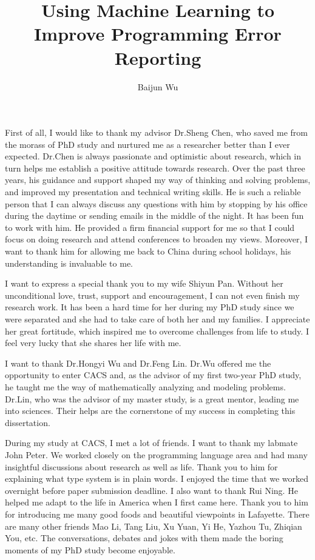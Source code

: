 \documentclass[12pt]{report}	%
\author{Baijun Wu}
\title{Using Machine Learning to Improve Programming Error Reporting}
\begin{document}
\titlepage              %

\copyrightpage          %

\approvalpage           %

%
%
%

\begin{acknowledgments}		%

First of all, I would like to thank my advisor Dr.Sheng Chen, 
who saved me from the morass of PhD study and nurtured me as a researcher better than I ever expected.
%
Dr.Chen is always passionate and optimistic about research,
which in turn helps me establish a positive attitude towards research.
Over the past three years, his guidance and support shaped my way of thinking and solving problems,
and improved my presentation and technical writing skills.
%
He is such a reliable person that I can always discuss any questions with him 
by stopping by his office during the daytime or sending emails in the middle of the night.
It has been fun to work with him.
%
He provided a firm financial support for me 
so that I could focus on doing research and attend conferences to broaden my views.
Moreover, I want to thank him for allowing me back to China during school holidays,
his understanding is invaluable to me.

I want to express a special thank you to my wife Shiyun Pan.
Without her unconditional love, trust, support and encouragement,
I can not even finish my research work.
%
It has been a hard time for her during my PhD study since we were separated
and she had to take care of both her and my families.
I appreciate her great fortitude, which inspired me to overcome challenges from life to study. 
I feel very lucky that she shares her life with me.

I want to thank Dr.Hongyi Wu and Dr.Feng Lin.
Dr.Wu offered me the opportunity to enter CACS and,
as the advisor of my first two-year PhD study, 
he taught me the way of mathematically analyzing and modeling problems.
Dr.Lin, who was the advisor of my master study, is a great mentor, leading me into sciences.
Their helps are the cornerstone of my success in completing this dissertation.

During my study at CACS, I met a lot of friends. I want to thank my labmate John Peter.
We worked closely on the programming language area and had many insightful discussions about research as well as life.
Thank you to him for explaining what type system is in plain words.
I enjoyed the time that we worked overnight before paper submission deadline.
%
I also want to thank Rui Ning.
He helped me adapt to the life in America when I first came here.
Thank you to him for introducing me many good foods and beautiful viewpoints in Lafayette.
%
There are many other friends Mao Li, Tang Liu, Xu Yuan, Yi He, Yazhou Tu, Zhiqian You, etc.
The conversations, debates and jokes with them made the boring moments of my PhD study become enjoyable. 



\end{acknowledgments}
\end{document}
